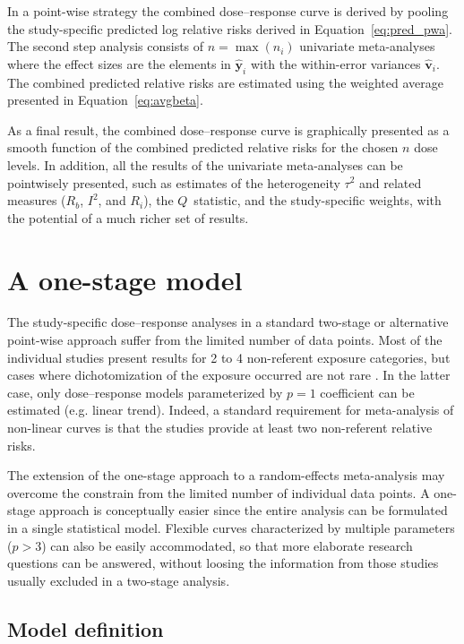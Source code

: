 \documentclass[11pt,a4paper,twoside,openany]{book}\usepackage{knitr}
\begin{document}
{In a point-wise strategy the combined dose--response curve is derived by pooling the study-specific predicted log relative risks derived in Equation~\ref{eq:pred_pwa}. The second step analysis consists of $n = \max(n_i)$ univariate meta-analyses where the effect sizes are the elements in $\hat {\boldsymbol y}_i$ with the within-error variances $\hat{\boldsymbol{v}}_i$.
The combined predicted relative risks are estimated using the weighted average presented in Equation~\ref{eq:avgbeta}.

As a final result, the combined dose--response curve is graphically presented as a smooth function of the combined predicted relative risks for the chosen $n$ dose levels. In addition, all the results of the univariate meta-analyses can be pointwisely presented, such as estimates of the heterogeneity $\tau^2$ and related measures ($R_b$, $I^2$, and $R_i$), the $Q$~statistic, and the study-specific weights, with the potential of a much richer set of results.


\section{A one-stage model}

The study-specific dose--response analyses in a standard two-stage or alternative point-wise approach suffer from the limited number of data points. Most of the individual studies present results for 2 to 4 non-referent exposure categories, but cases where dichotomization of the exposure occurred are not rare \citep{turner2010categorisation}. In the latter case, only dose--response models parameterized by $p = 1$ coefficient can be estimated (e.g. linear trend). Indeed, a standard requirement for meta-analysis of non-linear curves is that the studies provide at least two non-referent relative risks.

The extension of the one-stage approach to a random-effects meta-analysis may overcome the constrain from the limited number of individual data points. A one-stage approach is conceptually easier since the entire analysis can be formulated in a single statistical model. Flexible curves characterized by multiple parameters ($p > 3$) can also be easily accommodated, so that more elaborate research questions can be answered, without loosing the information from those studies usually excluded in a two-stage analysis.

\subsection{Model definition}

}
\end{document}
